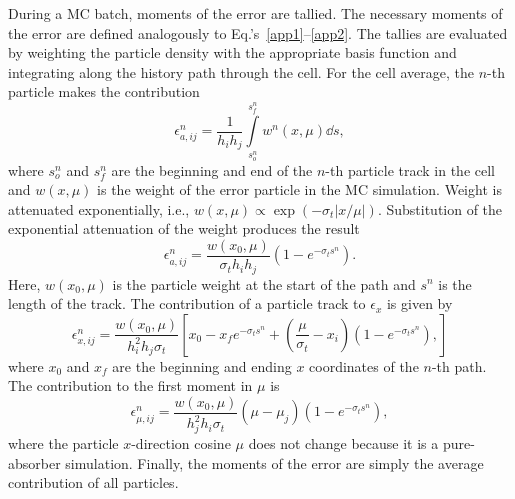 During a MC batch, moments of the error are tallied.  The necessary moments of the error are
defined analogously to Eq.'s~\eqref{app1}--\eqref{app2}.
The tallies are evaluated by weighting the particle density with the appropriate
basis function and integrating along the history path through the cell.  For the cell average, the $n$-th
particle makes the contribution
\begin{equation}
   \epsilon^n_{a,ij} = \frac{1}{h_ih_j} \int\limits_{s^n_o}^{s^n_f}  w^n(x,\mu) \dd s,
\end{equation}
where $s_o^n$ and $s_f^n$ are the beginning and end of the $n$-th particle track in the cell and $w(x,\mu)$ is
the weight of the error particle in the MC simulation.  Weight is attenuated exponentially, i.e., $w(x,\mu)\propto
\exp(-\sigma_t|x/\mu|)$.
Substitution of the exponential attenuation of the weight produces the result
\begin{equation}
    \epsilon^n_{a,ij} = \frac{w(x_0,\mu)}{\sigma_t h_i h_j} \left(1 -
    e^{-\sigma_ts^n}\right).
\end{equation}
Here, $w(x_0,\mu)$ is the particle weight at the start of the path and $s^n$ is the
length of the track. The contribution of a
particle track to $\epsilon_x$ is given by
\begin{equation}
    \epsilon^n_{x,ij} = \frac{w(x_0,\mu)}{h_i^2h_j \sigma_t} \left[x_0 - x_f e^{-\sigma_t s^n}
        + \left(\frac{\mu}{\sigma_t} - x_i \right)\left(1-e^{-\sigma_t s^n}\right),
    \right]
\end{equation}
where $x_0$ and $x_f$ are the beginning and ending $x$ coordinates of the $n$-th
path.  The contribution to the first moment in $\mu$ is 
\begin{equation}
    \epsilon^n_{\mu,ij} = \frac{w(x_0,\mu)}{h_{j}^2h_i\sigma_t}\left(\mu -
    \mu_j\right) \left(1 - e^{-\sigma_ts^n}\right),
\end{equation}
where the particle $x$-direction cosine $\mu$ does not change because it is a pure-absorber simulation.
Finally, the moments of the error are simply the average contribution of all particles.

